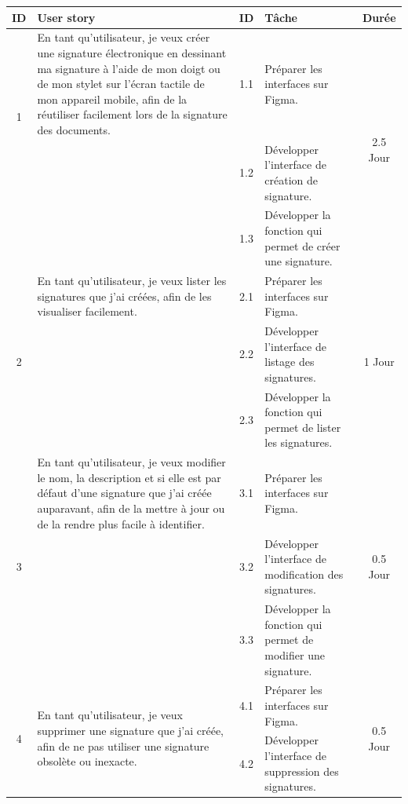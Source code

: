 \begin{adjustwidth}{-1cm}{}
    
    \begin{longtable}{|c|p{6cm}|c|p{6cm}|c|}
      \hline
      \textbf{ID} & \textbf{User story} & \textbf{ID}  & \textbf{Tâche} & \textbf{Durée} \\
      \hline
      \multirow{2}{*}{1} & En tant qu'utilisateur, je veux créer une signature électronique en dessinant ma signature à l'aide de mon doigt ou de mon stylet sur l'écran tactile de mon appareil mobile, afin de la réutiliser facilement lors de la signature des documents. & 1.1 & Préparer les interfaces sur Figma. & \multirow{3}{*}{2.5 Jour} \\
      \cline{3-4}
      & & 1.2 & Développer l'interface de création de signature. & \\
      \cline{3-4}
      & & 1.3 & Développer la fonction qui permet de créer une signature. & \\
      \cline{1-5}
      \multirow{3}{*}{2} & En tant qu'utilisateur, je veux lister les signatures que j'ai créées, afin de les visualiser facilement. & 2.1 & Préparer les interfaces sur Figma. & \multirow{3}{*}{1 Jour} \\
      \cline{3-4}
      & & 2.2 & Développer l'interface de listage des signatures. & \\
      \cline{3-4}
      & & 2.3 & Développer la fonction qui permet de lister les signatures. & \\
      \cline{1-5}
      \multirow{3}{*}{3} & En tant qu'utilisateur, je veux modifier le nom, la description et si elle est par défaut d'une signature que j'ai créée auparavant, afin de la mettre à jour ou de la rendre plus facile à identifier. & 3.1 & Préparer les interfaces sur Figma. & \multirow{3}{*}{0.5 Jour} \\
      \cline{3-4}
      & & 3.2 & Développer l'interface de modification des signatures. & \\
      \cline{3-4}
      & & 3.3 & Développer la fonction qui permet de modifier une signature. & \\
      \cline{1-5}
      \multirow{3}{*}{4} & \multirow{3}{6cm}{En tant qu'utilisateur, je veux supprimer une signature que j'ai créée, afin de ne pas utiliser une signature
      obsolète ou inexacte.} & 4.1 & Préparer les interfaces sur Figma. & \multirow{3}{*}{0.5 Jour} \\
      \cline{3-4}
      & & 4.2 & Développer l'interface de suppression des signatures. & \\

\end{longtable}
\end{adjustwidth}
